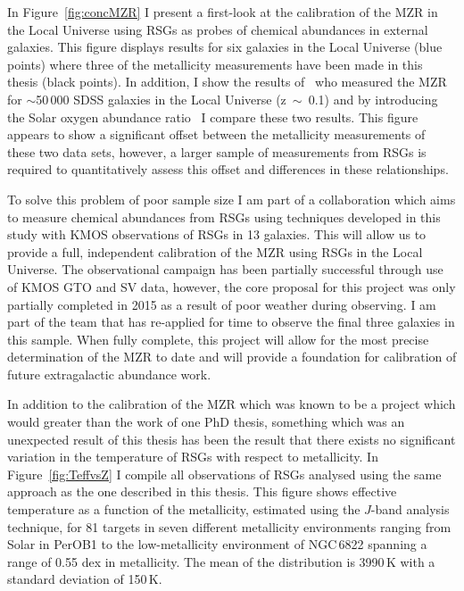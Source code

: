 In Figure~\ref{fig:concMZR} I present a first-look at the calibration of the MZR in the Local Universe using RSGs as probes of chemical abundances in external galaxies.
This figure displays results for six galaxies in the Local Universe (blue points) where three of the metallicity measurements have been made in this thesis (black points).
In addition, I show the results of~\cite{Tremonti04} who measured the MZR for $\sim$50\,000 SDSS galaxies in the Local Universe (z~$\sim$~0.1) and by introducing the Solar oxygen abundance ratio~\citep[12 + $\log$ (0/H)$_{\odot}$~=~8.69][]{2009ARA&A..47..481A} I compare these two results.
This figure appears to show a significant offset between the metallicity measurements of these two data sets, however, a larger sample of measurements from RSGs is required to quantitatively assess this offset and differences in these relationships.


To solve this problem of poor sample size I am part of a collaboration which aims to measure chemical abundances from RSGs using techniques developed in this study with KMOS observations of RSGs in 13 galaxies.
This will allow us to provide a full, independent calibration of the MZR using RSGs in the Local Universe.
The observational campaign has been partially successful through use of KMOS GTO and SV data, however, the core proposal for this project was only partially completed in 2015 as a result of poor weather during observing.
I am part of the team that has re-applied for time to observe the final three galaxies in this sample.
When fully complete, this project will allow for the most precise determination of the MZR to date and will provide a foundation for calibration of future extragalactic abundance work.


In addition to the calibration of the MZR which was known to be a project which would greater than the work of one PhD thesis, something which was an unexpected result of this thesis has been the result that there exists no significant variation in the temperature of RSGs with respect to metallicity.
In Figure~\ref{fig:TeffvsZ} I compile all observations of RSGs analysed using the same approach as the one described in this thesis.
This figure shows effective temperature as a function of the metallicity, estimated using the $J$-band analysis technique, for 81 targets in seven different metallicity environments ranging from Solar in PerOB1 to the low-metallicity environment of NGC\,6822 spanning a range of 0.55 dex in metallicity.
The mean of the distribution is 3990\,K with a standard deviation of 150\,K.

